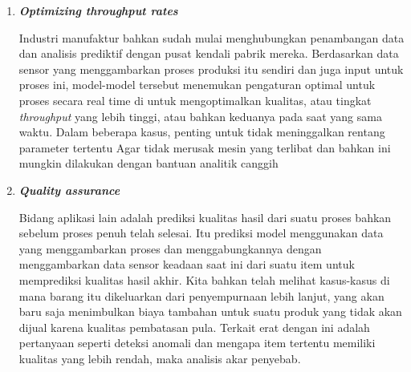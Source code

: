 \begin{enumerate}
\item 	\textit{\textbf{Optimizing throughput rates}}

\par Industri manufaktur bahkan sudah mulai menghubungkan penambangan data dan analisis prediktif dengan pusat kendali pabrik mereka. Berdasarkan data sensor yang menggambarkan proses produksi itu sendiri dan juga input untuk proses ini, model-model tersebut menemukan pengaturan optimal untuk proses secara real time di untuk mengoptimalkan kualitas, atau tingkat\textit{ throughput} yang lebih tinggi, atau bahkan keduanya pada saat yang sama waktu. Dalam beberapa kasus, penting untuk tidak meninggalkan rentang parameter tertentu Agar tidak merusak mesin yang terlibat dan bahkan ini mungkin dilakukan dengan bantuan analitik canggih

\item \textit{\textbf{Quality assurance}}
\par Bidang aplikasi lain adalah prediksi kualitas hasil dari suatu proses bahkan sebelum proses penuh telah selesai. Itu prediksi model menggunakan data yang menggambarkan proses dan menggabungkannya dengan menggambarkan data sensor keadaan saat ini dari suatu item untuk memprediksi kualitas hasil akhir. Kita bahkan telah melihat kasus-kasus di mana barang itu dikeluarkan dari penyempurnaan lebih lanjut, yang akan baru saja menimbulkan biaya tambahan untuk suatu produk yang tidak akan dijual karena kualitas pembatasan pula. Terkait erat dengan ini adalah pertanyaan seperti deteksi anomali dan mengapa item tertentu memiliki kualitas yang lebih rendah, maka analisis akar penyebab.
\end{enumerate}

